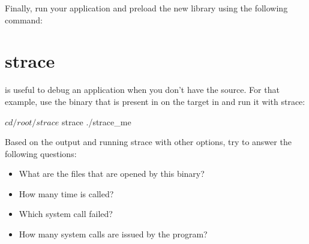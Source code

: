 Finally, run your application and preload the new library using the following
command:

\section{strace}

 is useful to debug an application when you don't have the source.
For that example, use the  binary that is present in on the
target in  and run it with strace:

\begin{bashinput}
$ cd /root/strace
$ strace ./strace_me
\end{bashinput}

Based on the output and running strace with other options, try to answer the
following questions:
\begin{itemize}
  \item What are the files that are opened by this binary?
  \item How many time is  called?
  \item Which  system call failed?
  \item How many system calls are issued by the program?
\end{itemize}
